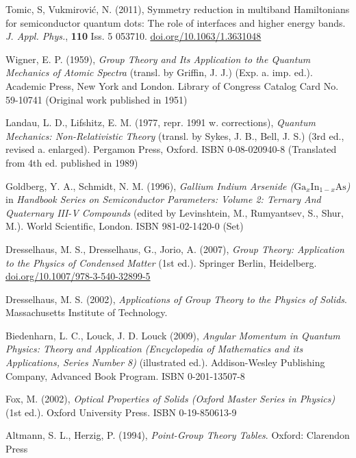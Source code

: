 \documentclass[12pt]{article}
\begin{document}
\begin{thebibliography}{10}
Tomic, S, Vukmirović, N. (2011), Symmetry reduction in multiband Hamiltonians for semiconductor quantum dots: The role of interfaces and higher energy bands. \textit{J. Appl. Phys.}, \textbf{110} Iss. 5 053710. \href{https://doi.org/10.1063/1.3631048}{doi.org/10.1063/1.3631048}

Wigner, E. P. (1959), \textit{Group Theory and Its Application to the Quantum Mechanics of Atomic Spectra} (transl. by Griffin, J. J.) (Exp. a. imp. ed.). Academic Press, New York and London. Library of Congress Catalog Card No. 59-10741 (Original work published in 1951)

Landau, L. D., Lifshitz, E. M. (1977, repr. 1991 w. corrections), \textit{Quantum Mechanics: Non-Relativistic Theory} (transl. by Sykes, J. B., Bell, J. S.) (3rd ed., revised a. enlarged). Pergamon Press, Oxford. ISBN 0-08-020940-8 (Translated from 4th ed. published in 1989)

Goldberg, Y. A., Schmidt, N. M. (1996), \textit{Gallium Indium Arsenide ($\text{Ga}_{x}\text{In}_{1-x}\text{As}$)} in \textit{Handbook Series on Semiconductor Parameters: Volume 2: Ternary And Quaternary III-V Compounds} (edited by Levinshtein, M., Rumyantsev, S., Shur, M.). World Scientific, London. ISBN  981-02-1420-0 (Set)

Dresselhaus, M. S., Dresselhaus, G., Jorio, A. (2007), \textit{Group Theory: Application to the Physics of Condensed Matter} (1st ed.). Springer Berlin, Heidelberg. \href{https://doi.org/10.1007/978-3-540-32899-5}{doi.org/10.1007/978-3-540-32899-5}

Dresselhaus, M. S. (2002), \textit{Applications of Group Theory to the Physics of Solids}. Massachusetts Institute of Technology.

Biedenharn, L. C., Louck, J. D. Louck (2009), \textit{Angular Momentum in Quantum Physics: Theory and Application (Encyclopedia of Mathematics and its Applications, Series Number 8)} (illustrated ed.). Addison-Wesley Publishing Company, Advanced Book Program. ISBN 0-201-13507-8

Fox, M. (2002), \textit{Optical Properties of Solids (Oxford Master Series in Physics)} (1st ed.). Oxford University Press. ISBN 0-19-850613-9

Altmann, S. L., Herzig, P. (1994), \textit{Point-Group Theory Tables}. Oxford: Clarendon Press

\end{thebibliography}



%





\end{document}
